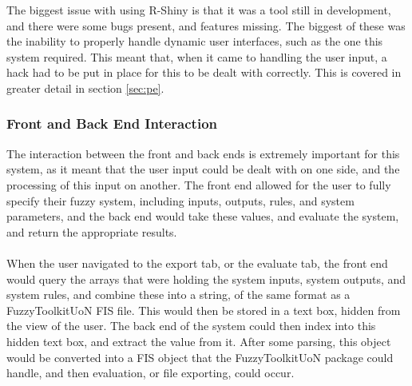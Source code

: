 \newpage 
\noindent 
The biggest issue with using R-Shiny is that it was a tool still in development, and there were some bugs present, and features missing. The biggest of these was the inability to properly handle dynamic user interfaces, such as the one this system required. This meant that, when it came to handling the user input, a hack had to be put in place for this to be dealt with correctly. This is covered in greater detail in section \ref{sec:pe}.

\tocless\subsubsection{Front and Back End Interaction}
\noindent 
The interaction between the front and back ends is extremely important for this system, as it meant that the user input could be dealt with on one side, and the processing of this input on another. The front end allowed for the user to fully specify their fuzzy system, including inputs, outputs, rules, and system parameters, and the back end would take these values, and evaluate the system, and return the appropriate results.\ \\
\ \\
When the user navigated to the export tab, or the evaluate tab, the front end would query the arrays that were holding the system inputs, system outputs, and system rules, and combine these into a string, of the same format as a FuzzyToolkitUoN FIS file. This would then be stored in a text box, hidden from the view of the user. The back end of the system could then index into this hidden text box, and extract the value from it. After some parsing, this object would be converted into a FIS object that the FuzzyToolkitUoN package could handle, and then evaluation, or file exporting, could occur.

